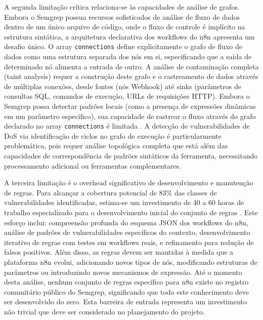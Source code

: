 \documentclass{sftex}
\begin{document}
A segunda limitação crítica relaciona-se às capacidades de análise de grafos. Embora o Semgrep possua recursos sofisticados de análise de fluxo de dados dentro de um único arquivo de código, onde o fluxo de controle é implícito na estrutura sintática, a arquitetura declarativa dos workflows do n8n apresenta um desafio único. O array \texttt{connections} define explicitamente o grafo de fluxo de dados como uma estrutura separada dos nós em si, especificando que a saída de determinado nó alimenta a entrada de outro. A análise de contaminação completa (taint analysis) requer a construção deste grafo e o rastreamento de dados através de múltiplas conexões, desde fontes (nós Webhook) até sinks (parâmetros de consultas SQL, comandos de execução, URLs de requisições HTTP). Embora o Semgrep possa detectar padrões locais (como a presença de expressões dinâmicas em um parâmetro específico), sua capacidade de rastrear o fluxo através do grafo declarado no array \texttt{connections} é limitada \cite{prototype_pollution}. A detecção de vulnerabilidades de DoS via identificação de ciclos no grafo de execução é particularmente problemática, pois requer análise topológica completa que está além das capacidades de correspondência de padrões sintáticos da ferramenta, necessitando processamento adicional ou ferramentas complementares.

A terceira limitação é o overhead significativo de desenvolvimento e manutenção de regras. Para alcançar a cobertura potencial de 83\% das classes de vulnerabilidades identificadas, estima-se um investimento de 40 a 60 horas de trabalho especializado para o desenvolvimento inicial do conjunto de regras \cite{semgrep_custom_rules}. Este esforço inclui: compreensão profunda do esquema JSON dos workflows do n8n, análise de padrões de vulnerabilidades específicos do contexto, desenvolvimento iterativo de regras com testes em workflows reais, e refinamento para redução de falsos positivos. Além disso, as regras devem ser mantidas à medida que a plataforma n8n evolui, adicionando novos tipos de nós, modificando estruturas de parâmetros ou introduzindo novos mecanismos de expressão. Até o momento desta análise, nenhum conjunto de regras específico para n8n existe no registro comunitário público do Semgrep, significando que todo este conhecimento deve ser desenvolvido do zero. Esta barreira de entrada representa um investimento não trivial que deve ser considerado no planejamento do projeto.
\end{document}
